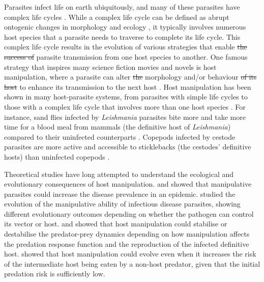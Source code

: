 \documentclass[a4paper]{scrartcl}
\providecommand{\DIFaddtex}[1]{{\protect\color{blue}\uwave{#1}}} %
\providecommand{\DIFdeltex}[1]{{\protect\color{red}\sout{#1}}}                      %
\providecommand{\DIFaddbegin}{} %
\providecommand{\DIFaddend}{} %
\providecommand{\DIFdelbegin}{} %
\providecommand{\DIFdelend}{} %
\providecommand{\DIFadd}[1]{\texorpdfstring{\DIFaddtex{#1}}{#1}} %
\providecommand{\DIFdel}[1]{\texorpdfstring{\DIFdeltex{#1}}{}} %
\newcommand{\DIFscaledelfig}{0.5}
\newlength{\DIFdelgraphicswidth} %
\newlength{\DIFdelgraphicsheight} %
\newcommand{\DIFaddincludegraphics}[2][]{{\color{blue}\fbox{\DIFOincludegraphics[#1]{#2}}}} %
\newcommand{\DIFdelincludegraphics}[2][]{%
\sbox{\DIFdelgraphicsbox}{\DIFOincludegraphics[#1]{#2}}%
\settoboxwidth{\DIFdelgraphicswidth}{\DIFdelgraphicsbox} %
\settoboxtotalheight{\DIFdelgraphicsheight}{\DIFdelgraphicsbox} %
\scalebox{\DIFscaledelfig}{%
\parbox[b]{\DIFdelgraphicswidth}{\usebox{\DIFdelgraphicsbox}\\[-\baselineskip] \rule{\DIFdelgraphicswidth}{0em}}\llap{\resizebox{\DIFdelgraphicswidth}{\DIFdelgraphicsheight}{%
\setlength{\unitlength}{\DIFdelgraphicswidth}%
\begin{picture}(1,1)%
\thicklines\linethickness{2pt} %
{\color[rgb]{1,0,0}\put(0,0){\framebox(1,1){}}}%
{\color[rgb]{1,0,0}\put(0,0){\line( 1,1){1}}}%
{\color[rgb]{1,0,0}\put(0,1){\line(1,-1){1}}}%
\end{picture}%
}\hspace*{3pt}}} %
} %
\DeclareRobustCommand{\DIFaddbegin}{\DIFOaddbegin \let\includegraphics\DIFaddincludegraphics} %
\DeclareRobustCommand{\DIFaddend}{\DIFOaddend \let\includegraphics\DIFOincludegraphics} %
\DeclareRobustCommand{\DIFdelbegin}{\DIFOdelbegin \let\includegraphics\DIFdelincludegraphics} %
\DeclareRobustCommand{\DIFdelend}{\DIFOaddend \let\includegraphics\DIFOincludegraphics} %
\begin{document}
Parasites infect life on earth ubiquitously, and many of these parasites have complex life cycles \citep{zimmer:book:2001}. 
While a complex life cycle can be defined as abrupt ontogenic changes in morphology and ecology \citep{Benesh:2016dj}, it typically involves numerous host species that a parasite needs to traverse to complete its life cycle. 
This complex life cycle results in the evolution of various strategies that enable \DIFdelbegin \DIFdel{the success of }\DIFdelend \DIFaddbegin \DIFadd{successful }\DIFaddend parasite transmission from one host species to another. 
One famous strategy that inspires many science fiction movies and novels is host manipulation, where a parasite can alter \DIFdelbegin \DIFdel{the }\DIFdelend \DIFaddbegin \DIFadd{its host's }\DIFaddend morphology and/or behaviour \DIFdelbegin \DIFdel{of its  host }\DIFdelend to enhance its transmission to the next host \citep{Hughes2012}. 
Host manipulation has been shown in many host-parasite systems, from parasites with simple life cycles to those with a complex life cycle that involves more than one host species \citep{Hughes2012,molyneux_jefferies1986}. 
For instance, sand flies infected by \textit{Leishmania} parasites bite more and take more time for a blood meal from mammals (the definitive host of \textit{Leishmania}) compared to their uninfected counterparts \citep{Rogers2007}. 
Copepods infected by cestode parasites are more active and accessible to sticklebacks (the cestodes' definitive hosts) than uninfected copepods \citep{Wedekind1996}.

Theoretical studies have long attempted to understand the ecological and evolutionary consequences of host manipulation. 
\cite{Roosien2013} and \cite{Hosack2008} showed that manipulative parasites could increase the disease prevalence in an epidemic. \cite{Gandon2018} studied the evolution of the manipulative ability of infectious disease parasites, showing different evolutionary outcomes depending on whether the pathogen can control its vector or host.
\cite{Hadeler1989, Fenton2006} and \cite{Rogawa2018} showed that host manipulation could stabilise or destabilise the predator-prey dynamics depending on how manipulation affects the predation response function and the reproduction of the infected definitive host. 
\cite{Seppl2008} showed that host manipulation could evolve even when it increases the risk of the intermediate host being eaten by a non-host predator, given that the initial predation risk is sufficiently low.  
\end{document}
